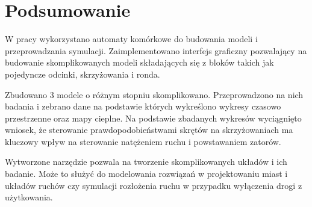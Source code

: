 \documentclass{article}
\begin{document}
\section{Podsumowanie}

W pracy wykorzystano automaty komórkowe do budowania modeli i przeprowadzania symulacji. Zaimplementowano interfejs graficzny pozwalający na budowanie skomplikowanych modeli składających się z bloków takich jak pojedyncze odcinki, skrzyżowania i ronda.

Zbudowano 3 modele o różnym stopniu skomplikowano. Przeprowadzono na nich badania i zebrano dane na podstawie których wykreślono wykresy czasowo przestrzenne oraz mapy cieplne. Na podstawie zbadanych wykresów wyciągnięto wniosek, że sterowanie prawdopodobieństwami skrętów na skrzyżowaniach ma kluczowy wpływ na sterowanie natężeniem ruchu i powstawaniem zatorów. 

Wytworzone narzędzie pozwala na tworzenie skomplikowanych układów i ich badanie. Może to służyć do modelowania rozwiązań w projektowaniu miast i układów ruchów czy symulacji rozłożenia ruchu w przypadku wyłączenia drogi z użytkowania.


  
\end{document}

